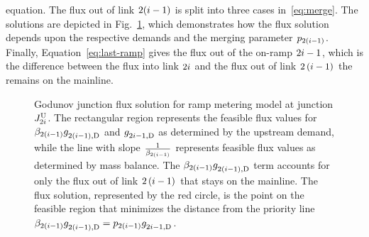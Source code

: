 equation. The flux out of link $2(i-1)$ is split into three cases
in~\eqref{eq:merge}. The solutions are depicted in Fig.~\ref{fig:Godunov-junction-flux},
which demonstrates how the flux solution depends upon the respective
demands and the merging parameter $p_{2\left(i-1\right)}$. Finally,
Equation~\eqref{eq:last-ramp} gives the flux out of the on-ramp $2i-1$,
which is the difference between the flux into link $2i$ and the
flux out of link $2\left(i-1\right)$ the remains on the mainline.
\begin{figure}
\hfill{}\hfill{}

\caption{Godunov junction flux solution for ramp metering model at junction
$J_{2i}^{\text{U}}$. The rectangular region represents the feasible flux
values for $\beta_{2\left(i-1\right)}g_{2\left(i-1\right),\text{D}}^{}$
and $g_{2i-1,\text{D}}^{}$ as determined by the upstream demand, while
the line with slope\label{fig:Godunov-junction-flux} $\frac{1}{\beta_{2\left(i-1\right)}}$
represents feasible flux values as determined by mass balance. The
$\beta_{2\left(i-1\right)}g_{2\left(i-1\right),\text{D}}^{}$
term accounts for only the flux out of link $2\left(i-1\right)$
that stays on the mainline. The flux solution, represented by the
red circle, is the point on the feasible region that minimizes the
distance from the priority line $\beta_{2\left(i-1\right)}g_{2\left(i-1\right),\text{D}}^{}=p_{2(i-1)}g_{2i-1,\text{D}}^{}$.}
\end{figure}


